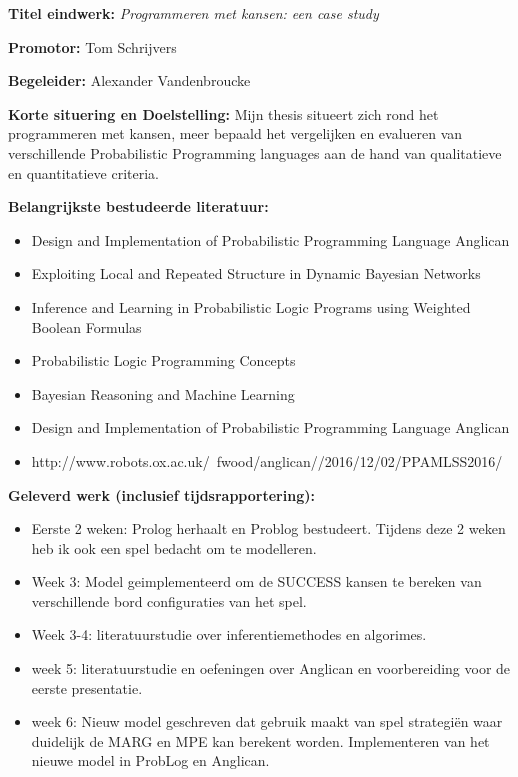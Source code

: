 \documentclass[12pt]{report}
\begin{document}
\pagestyle{myheadings}
{\bf Titel eindwerk:} {\em Programmeren met kansen: een case study}


\vspace{0.5cm}
{\bf Promotor:} Tom Schrijvers


\vspace{0.5cm}
{\bf Begeleider:} Alexander Vandenbroucke

\vspace{1cm}
{\bf Korte situering en Doelstelling: } 
Mijn thesis situeert zich rond het programmeren met kansen, meer bepaald het vergelijken en evalueren van verschillende Probabilistic Programming languages aan de hand van qualitatieve en quantitatieve criteria.

\vspace{1cm}
{\bf Belangrijkste bestudeerde literatuur:}
\begin{itemize}
\item Design and Implementation of Probabilistic Programming Language Anglican
\item Exploiting Local and Repeated Structure in Dynamic Bayesian Networks
\item Inference and Learning in Probabilistic Logic Programs using Weighted Boolean Formulas
\item Probabilistic Logic Programming Concepts
\item Bayesian Reasoning and Machine Learning
\item Design and Implementation of Probabilistic Programming Language Anglican
\item http://www.robots.ox.ac.uk/~fwood/anglican//2016/12/02/PPAMLSS2016/
\end{itemize}

\vspace{1cm}
{\bf Geleverd werk (inclusief tijdsrapportering):}
\begin{itemize}
\item Eerste 2 weken: Prolog herhaalt en Problog bestudeert. Tijdens deze 2 weken heb ik ook een spel bedacht om te modelleren. 
\item Week 3: Model geimplementeerd om de SUCCESS kansen te bereken van verschillende bord configuraties van het spel.
\item Week 3-4: literatuurstudie over inferentiemethodes en algorimes.
\item week 5: literatuurstudie en oefeningen over Anglican en voorbereiding voor de eerste presentatie.
\item week 6: Nieuw model geschreven dat gebruik maakt van spel strategi\"{e}n waar duidelijk de MARG en MPE kan berekent worden. Implementeren van het nieuwe model in ProbLog en Anglican.
\end{itemize}
\end{document}
